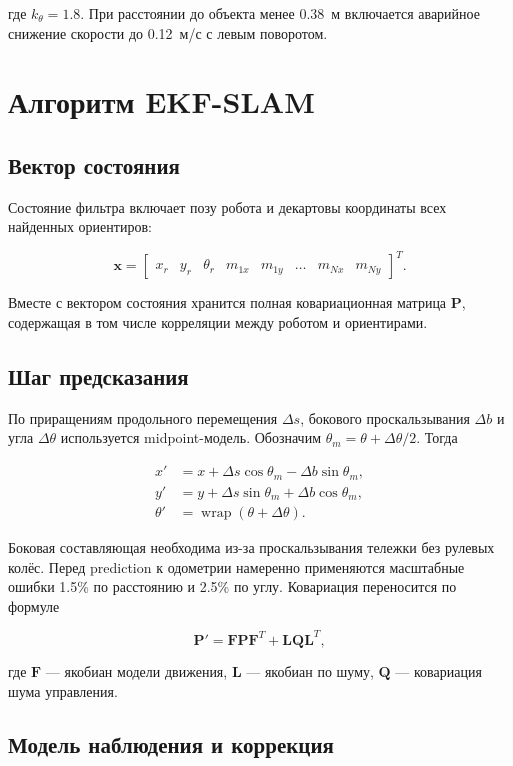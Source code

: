 \documentclass[a4paper,12pt]{article}
\begin{document}
где $k_\theta=1.8$. При расстоянии до объекта менее 0.38~м включается аварийное
снижение скорости до 0.12~м/с с левым поворотом.

\section{Алгоритм EKF-SLAM}

\subsection{Вектор состояния}

Состояние фильтра включает позу робота и декартовы координаты всех найденных
ориентиров:

\[
\mathbf{x}=\begin{bmatrix}
x_r&y_r&\theta_r&m_{1x}&m_{1y}&\ldots&m_{Nx}&m_{Ny}
\end{bmatrix}^{T}.
\]

Вместе с вектором состояния хранится полная ковариационная матрица
$\mathbf{P}$, содержащая в том числе корреляции между роботом и ориентирами.

\subsection{Шаг предсказания}

По приращениям продольного перемещения $\Delta s$, бокового проскальзывания
$\Delta b$ и угла $\Delta\theta$ используется midpoint-модель. Обозначим
$\theta_m=\theta+\Delta\theta/2$. Тогда

\[
\begin{aligned}
x'&=x+\Delta s\cos\theta_m-\Delta b\sin\theta_m,\\
y'&=y+\Delta s\sin\theta_m+\Delta b\cos\theta_m,\\
\theta'&=\operatorname{wrap}(\theta+\Delta\theta).
\end{aligned}
\]

Боковая составляющая необходима из-за проскальзывания тележки без рулевых
колёс. Перед prediction к одометрии намеренно применяются масштабные ошибки
1.5\% по расстоянию и 2.5\% по углу. Ковариация переносится по формуле

\[
\mathbf{P}'=\mathbf{F}\mathbf{P}\mathbf{F}^{T}
+\mathbf{L}\mathbf{Q}\mathbf{L}^{T},
\]

где $\mathbf{F}$ --- якобиан модели движения, $\mathbf{L}$ --- якобиан по шуму,
$\mathbf{Q}$ --- ковариация шума управления.

\subsection{Модель наблюдения и коррекция}
\end{document}
